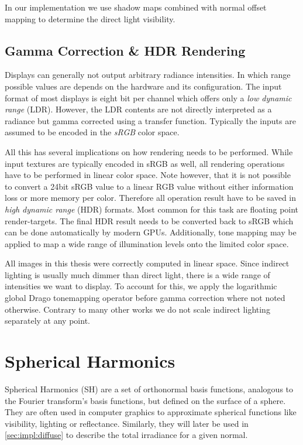 \documentclass[thesis.tex]{subfiles}
\begin{document}
In our implementation we use shadow maps combined with normal offset mapping to determine the direct light visibility.

\subsection{Gamma Correction \& HDR Rendering}
Displays can generally not output arbitrary radiance intensities.
In which range possible values are depends on the hardware and its configuration.
The input format of most displays is eight bit per channel which offers only a \emph{low dynamic range} (LDR).
However, the LDR contents are not directly interpreted as a radiance but gamma corrected using a transfer function.
Typically the inputs are assumed to be encoded in the \emph{sRGB} color space.

All this has several implications on how rendering needs to be performed.
While input textures are typically encoded in sRGB as well, all rendering operations have to be performed in linear color space.
Note however, that it is not possible to convert a 24bit sRGB value to a linear RGB value without either information loss or more memory per color.
Therefore all operation result have to be saved in \emph{high dynamic range} (HDR) formats.
Most common for this task are floating point render-targets.
The final HDR result needs to be converted back to sRGB which can be done automatically by modern GPUs.
Additionally, tone mapping may be applied to map a wide range of illumination levels onto the limited color space.

All images in this thesis were correctly computed in linear space.
Since indirect lighting is usually much dimmer than direct light, there is a wide range of intensities we want to display.
To account for this, we apply the logarithmic global Drago tonemapping operator \cite{bib:tonemapdrago} before gamma correction where not noted otherwise.
Contrary to many other works we do not scale indirect lighting separately at any point.

\section{Spherical Harmonics}\label{sec:preq:sh}
Spherical Harmonics (SH) are a set of orthonormal basis functions, analogous to the Fourier transform's basis functions, but defined on the surface of a sphere.
They are often used in computer graphics to approximate spherical functions like visibility, lighting or reflectance. Similarly, they will later be used in \autoref{sec:impl:diffuse} to describe the total irradiance for a given normal.
\end{document}
